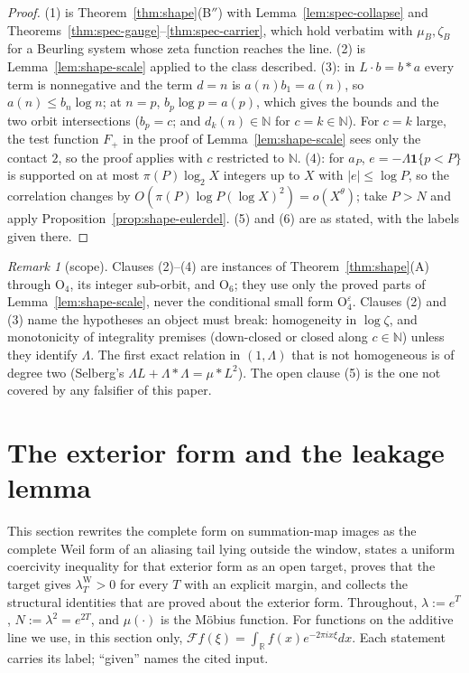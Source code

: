 \documentclass[11pt]{amsart}
\theoremstyle{definition}
\theoremstyle{remark}
\newtheorem{remark}[theorem]{Remark}
\newcommand{\R}{\mathbb R}
\newcommand{\N}{\mathbb N}
\newcommand{\lamW}{\lambda^{\mathrm W}_T}
\begin{document}
\begin{proof}
(1) is Theorem~\ref{thm:shape}(B$''$) with Lemma~\ref{lem:spec-collapse} and Theorems~\ref{thm:spec-gauge}--\ref{thm:spec-carrier}, which
hold verbatim with $\mu_B,\zeta_B$ for a Beurling system whose zeta function reaches the line. (2) is Lemma~\ref{lem:shape-scale} applied
to the class described. (3): in $L\cdot b=b*a$ every term is nonnegative and the term $d=n$ is $a(n)b_1=a(n)$, so $a(n)\le b_n\log n$;
at $n=p$, $b_p\log p=a(p)$, which gives the bounds and the two orbit intersections ($b_p=c$; and $d_k(n)\in\N$ for $c=k\in\N$). For
$c=k$ large, the test function $F_+$ in the proof of Lemma~\ref{lem:shape-scale} sees only the contact $2$, so the proof applies with
$c$ restricted to $\N$. (4): for $a_P$, $e=-\Lambda\mathbf 1\{p<P\}$ is supported on at most $\pi(P)\log_2X$ integers up to $X$ with
$|e|\le\log P$, so the correlation changes by $O(\pi(P)\log P(\log X)^2)=o(X^\theta)$; take $P>N$ and apply
Proposition~\ref{prop:shape-eulerdel}. (5) and (6) are as stated, with the labels given there.
\end{proof}

\begin{remark}[scope]\label{rem:spec-scope}
Clauses (2)--(4) are instances of Theorem~\ref{thm:shape}(A) through $\mathrm O_4$, its integer sub-orbit, and $\mathrm O_6$; they use only
the proved parts of Lemma~\ref{lem:shape-scale}, never the conditional small form $\mathrm O_4^\varepsilon$. Clauses (2) and (3) name
the hypotheses an object must break: homogeneity in $\log\zeta$, and monotonicity of integrality premises (down-closed or closed along
$c\in\N$) unless they identify $\Lambda$. The first exact relation in $(1,\Lambda)$ that is not homogeneous is of degree two (Selberg's
$\Lambda L+\Lambda*\Lambda=\mu*L^2$). The open clause (5) is the one not covered by any falsifier of this paper.
\end{remark}

\section{The exterior form and the leakage lemma}\label{sec:ext}

This section rewrites the complete form on summation-map images as the complete Weil form of an aliasing tail lying
outside the window, states a uniform coercivity inequality for that exterior form as an open target, proves that the
target gives $\lamW>0$ for every $T$ with an explicit margin, and collects the structural identities that are proved about
the exterior form. Throughout, $\lambda:=e^T$, $N:=\lambda^2=e^{2T}$, and $\mu(\cdot)$ is the M\"obius function. For
functions on the additive line we use, in this section only, $\mathcal Ff(\xi)=\int_\R f(x)e^{-2\pi ix\xi}dx$. Each
statement carries its label; ``given'' names the cited input.
\end{document}
